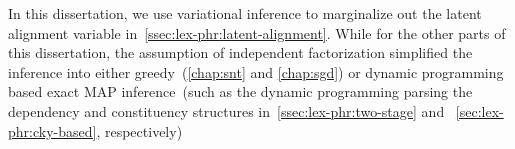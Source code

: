 In this dissertation, we use variational inference to marginalize out the
latent alignment variable
in~\autoref{ssec:lex-phr:latent-alignment}. While for the other parts
of this dissertation, the assumption of independent factorization simplified
the inference into either greedy~(\autoref{chap:snt} and
\autoref{chap:sgd}) or dynamic programming based exact MAP
inference~(such as the dynamic programming parsing the dependency and
constituency structures in~\autoref{ssec:lex-phr:two-stage} and
~\autoref{sec:lex-phr:cky-based}, respectively)

